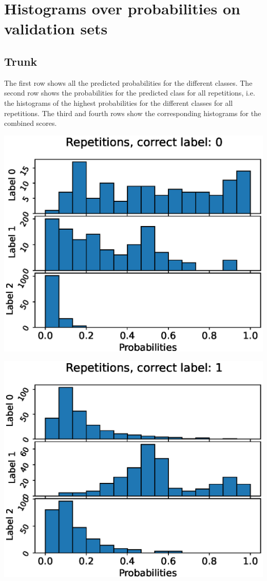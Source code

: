 \chapter{Histograms over probabilities on validation sets} \label{app:val-hists}
\section{Trunk}
The first row shows all the predicted probabilities for the different classes. The second row shows the probabilities for the predicted class for all repetitions, i.e. the histograms of the highest probabilities for the different classes for all repetitions. The third and fourth rows show the corresponding histograms for the combined scores.

\begin{center}
\begin{minipage}{0.33\textwidth}
  \includegraphics[width=\textwidth]{files/figs/app/hists/trunk/r0.eps}
\end{minipage}%
\begin{minipage}{0.33\textwidth}
  \includegraphics[width=\textwidth]{files/figs/app/hists/trunk/r1.eps}

\end{minipage}
\end{center}

